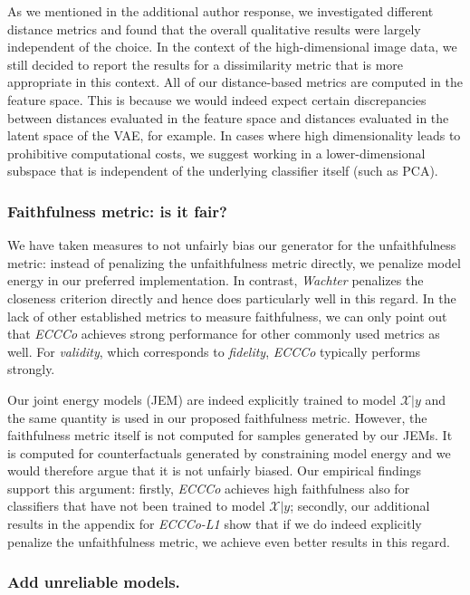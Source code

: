 \documentclass[letterpaper]{article} %
\begin{document}
As we mentioned in the additional author response, we investigated different distance metrics and found that the overall qualitative results were largely independent of the choice. In the context of the high-dimensional image data, we still decided to report the results for a dissimilarity metric that is more appropriate in this context. All of our distance-based metrics are computed in the feature space. This is because we would indeed expect certain discrepancies between distances evaluated in the feature space and distances evaluated in the latent space of the VAE, for example. In cases where high dimensionality leads to prohibitive computational costs, we suggest working in a lower-dimensional subspace that is independent of the underlying classifier itself (such as PCA).

\subsubsection{Faithfulness metric: is it fair?}

We have taken measures to not unfairly bias our generator for the unfaithfulness metric: instead of penalizing the unfaithfulness metric directly, we penalize model energy in our preferred implementation. In contrast, \textit{Wachter} penalizes the closeness criterion directly and hence does particularly well in this regard. In the lack of other established metrics to measure faithfulness, we can only point out that \textit{ECCCo} achieves strong performance for other commonly used metrics as well. For \textit{validity}, which corresponds to \textit{fidelity}, \textit{ECCCo} typically performs strongly.

Our joint energy models (JEM) are indeed explicitly trained to model $\mathcal{X}|y$ and the same quantity is used in our proposed faithfulness metric. However, the faithfulness metric itself is not computed for samples generated by our JEMs. It is computed for counterfactuals generated by constraining model energy and we would therefore argue that it is not unfairly biased. Our empirical findings support this argument: firstly, \textit{ECCCo} achieves high faithfulness also for classifiers that have not been trained to model $\mathcal{X}|y$; secondly, our additional results in the appendix for \textit{ECCCo-L1} show that if we do indeed explicitly penalize the unfaithfulness metric, we achieve even better results in this regard. 

\subsubsection{Add unreliable models.}
\end{document}
